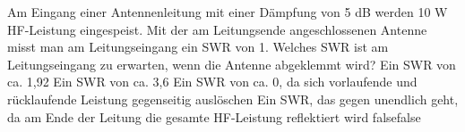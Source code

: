     {Am Eingang einer Antennenleitung mit einer Dämpfung von 5 dB werden 10 W HF-Leistung eingespeist. Mit der am Leitungsende angeschlossenen Antenne misst man am Leitungseingang ein SWR von 1. Welches SWR ist am Leitungseingang zu erwarten, wenn die Antenne abgeklemmt wird?}
    {Ein SWR von ca. 1,92}
    {Ein SWR von ca. 3,6}
    {Ein SWR von ca. 0, da sich vorlaufende und rücklaufende Leistung gegenseitig auslöschen}
    {Ein SWR, das gegen unendlich geht, da am Ende der Leitung die gesamte HF-Leistung reflektiert wird}
    {false}{false}
